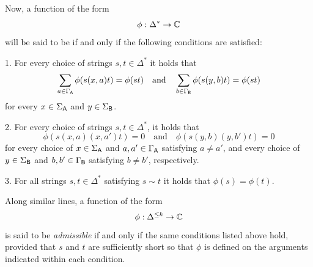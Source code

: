 Now, a function of the form 
\begin{equation}
  \phi: \Delta^{\ast} \rightarrow \mathbb{C}
\end{equation}
will be said to be  if and only if the following conditions are
satisfied:
\begin{mylist}{\parindent}
\item[1.] For every choice of strings $s,t\in\Delta^{\ast}$ it holds that
  \begin{equation} \label{eq:enpa-sum-strings}
    \sum_{a\in \Gamma_{\mathsf{A}}} \phi(s (x,a) t) = \phi(st)
    \quad\text{and}\quad
    \sum_{b\in \Gamma_{\mathsf{B}}} \phi(s (y,b) t) = \phi(st)
  \end{equation}
  for every $x\in \Sigma_{\mathsf{A}}$ and $y\in \Sigma_{\mathsf{B}}$.
\item[2.]
  For every choice of strings $s,t\in \Delta^{\ast}$, it holds that
  \begin{equation}
    \phi(s (x,a) (x,a') t) = 0 \quad\text{and}\quad
    \phi(s (y,b) (y,b') t) = 0
  \end{equation}
  for every choice of $x\in \Sigma_{\mathsf{A}}$ and $a,a'\in \Gamma_{\mathsf{A}}$ satisfying $a \not= a'$, 
  and every choice of $y\in \Sigma_{\mathsf{B}}$ and $b,b'\in \Gamma_{\mathsf{B}}$ satisfying $b \not= b'$, 
  respectively.
\item[3.]
  For all strings $s,t\in\Delta^{\ast}$ satisfying $s\sim t$ it
  holds that $\phi(s) = \phi(t)$.
\end{mylist}
Along similar lines, a function of the form
\begin{equation}
  \phi: \Delta^{\leq k} \rightarrow \mathbb{C}
\end{equation}
is said to be \emph{admissible} if and only if the same conditions listed above
hold, provided that $s$ and $t$ are sufficiently short so that $\phi$ is defined
on the arguments indicated within each condition.

